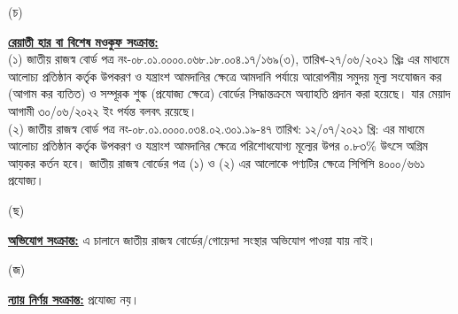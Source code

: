 \documentclass[12pt]{article}
\newcommand{\cpcsso}{সিপিসি ৪০০০/৬৬১}
\begin{document}
\begin{minipage}[t]{0.05\linewidth}
\hspace{1em}
\end{minipage}
\begin{minipage}[t]{0.05\linewidth}
(চ)
\end{minipage}
\begin{minipage}[t]{0.90\linewidth}
\underline{\textbf{রেয়াতী হার বা বিশেষ মওকুফ সংক্রান্ত:}}
\\
(১) জাতীয় রাজস্ব বোর্ড পত্র নং-০৮.০১.০০০০.০৬৮.১৮.০০৪.১৭/১৬৯(৩),
তারিখ-২৭/০৬/২০২১ খ্রিঃ এর মাধ্যমে আলোচ্য প্রতিষ্ঠান কর্তৃক উপকরণ ও যন্ত্রাংশ
আমদানির ক্ষেত্রে আমদানি পর্যায়ে আরোপনীয় সমুদয় মূল্য সংযোজন কর (আগাম কর ব্যতিত)
ও সম্পূরক শুল্ক (প্রযোজ্য ক্ষেত্রে) বোর্ডের সিদ্ধান্তক্রমে অব্যাহতি প্রদান করা হয়েছে।
যার মেয়াদ আগামী ৩০/০৬/২০২২ ইং পর্যন্ত বলবৎ
রয়েছে।
\\
(২) জাতীয় রাজস্ব বোর্ড পত্র নং-০৮.০১.০০০০.০৩৪.০২.৩০১.১৯-৪৭
তারিখ: ১২/০৭/২০২১ খ্রি: এর মাধ্যমে
আলোচ্য প্রতিষ্ঠান কর্তৃক উপকরণ ও যন্ত্রাংশ
আমদানির ক্ষেত্রে
পরিশোধযোগ্য মূল্যের উপর ০.৮৩\%
উৎসে অগ্রিম আয়কর কর্তন হবে।
জাতীয় রাজস্ব বোর্ডের পত্র
(১) ও (২)
এর আলোকে পণ্যটির ক্ষেত্রে {\cpcsso} প্রযোজ্য।
\\
\end{minipage}
\begin{minipage}[t]{0.05\linewidth}
\hspace{1em}
\end{minipage}
\begin{minipage}[t]{0.05\linewidth}
(ছ)
\end{minipage}
\begin{minipage}[t]{0.90\linewidth}
\underline{\textbf{অভিযোগ সংক্রান্ত:}} এ চালানে জাতীয় রাজস্ব বোর্ডের/গোয়েন্দা
সংস্থার অভিযোগ পাওয়া যায় নাই।
\\
\end{minipage}
\begin{minipage}[t]{0.05\linewidth}
\hspace{1em}
\end{minipage}
\begin{minipage}[t]{0.05\linewidth}
(জ)
\end{minipage}
\begin{minipage}[t]{0.90\linewidth}
\underline{\textbf{ন্যায় নির্ণয় সংক্রান্ত:}} প্রযোজ্য নয়।
\\
\end{minipage}
\begin{minipage}[t]{0.05\linewidth}
\hspace{1em}
\end{minipage}
\end{document}

